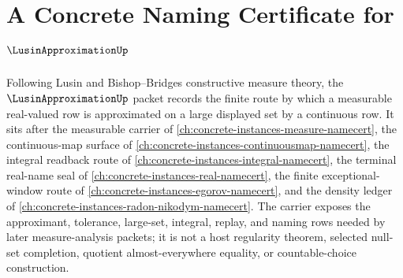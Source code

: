 \chapter{A Concrete Naming Certificate for $\LusinApproximationUp$}
\label{ch:concrete-instances-lusin-approximation-namecert}

Following Lusin and Bishop--Bridges constructive measure theory, the $\LusinApproximationUp$ packet records the finite route by which a measurable real-valued row is approximated on a large displayed set by a continuous row. It sits after the measurable carrier of \autoref{ch:concrete-instances-measure-namecert}, the continuous-map surface of \autoref{ch:concrete-instances-continuousmap-namecert}, the integral readback route of \autoref{ch:concrete-instances-integral-namecert}, the terminal real-name seal of \autoref{ch:concrete-instances-real-namecert}, the finite exceptional-window route of \autoref{ch:concrete-instances-egorov-namecert}, and the density ledger of \autoref{ch:concrete-instances-radon-nikodym-namecert}. The carrier exposes the approximant, tolerance, large-set, integral, replay, and naming rows needed by later measure-analysis packets; it is not a host regularity theorem, selected null-set completion, quotient almost-everywhere equality, or countable-choice construction.

